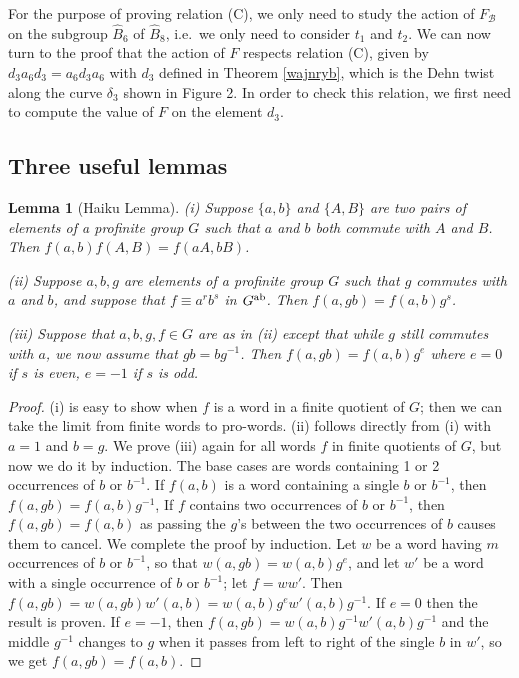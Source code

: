 \documentclass[a4paper,10pt,reqno]{amsart}
\newcommand\B{\widehat{B}}
\newtheorem{lem}[thm]{Lemma}
\begin{document}
For the purpose of proving relation (C), we only need to study the action of $F_{\mathcal{B}}$
on the subgroup $\B_6$ of $\B_8$, i.e.~we only need to consider $t_1$ and $t_2$.
We can now turn to the proof that the action of $F$ respects relation (C), given by
$d_3a_6d_3=a_6d_3a_6$ with $d_3$ defined in Theorem \ref{wajnryb},
which is the Dehn twist along the curve $\delta_3$ shown in Figure 2. In order
to check this relation, we first need to compute the value of $F$ on the element $d_3$. 

\subsection{Three useful lemmas}

\begin{lem}[Haiku Lemma] {\it (i) Suppose $\{a,b\}$ and $\{A,B\}$ are two pairs of elements of 
a profinite group $G$ such that $a$ and $b$ both commute with $A$ and $B$.  
Then $f(a,b)f(A,B)=f(aA,bB)$.

\vspace{.1cm}\noindent
(ii) Suppose $a,b,g$ are elements of a profinite group $G$
such that $g$ commutes with $a$ and $b$, and suppose that $f\equiv a^rb^s$ in $G^{\rm ab}$.
Then $f(a,gb)=f(a,b)g^s$.

\vspace{.1cm}
\noindent (iii) Suppose that $a,b,g,f\in G$ are as in (ii) except that while $g$ still commutes with
$a$, we now assume that $gb=bg^{-1}$. Then $f(a,gb)=f(a,b)g^e$ where $e=0$ if $s$ is even, 
$e=-1$ if $s$ is odd.}
\end{lem}

\begin{proof}

(i) is easy to show when $f$ is a word in a finite quotient of
$G$; then we can take the limit from finite words to pro-words. (ii) follows directly from (i)
with $a=1$ and $b=g$. We prove (iii) again for all words $f$ in finite quotients of $G$, but
now we do it by induction. The base cases are words containing 1 or 2 occurrences of $b$ or $b^{-1}$.
If $f(a,b)$ is a word containing a single $b$ or $b^{-1}$, then $f(a,gb)=f(a,b)g^{-1}$,
If $f$ contains two occurrences
of $b$ or $b^{-1}$, then $f(a,gb)=f(a,b)$ as passing the $g$'s between the two occurrences of $b$
causes them to cancel. We complete the proof by induction. Let $w$ be a word having $m$ occurrences
of $b$ or $b^{-1}$, so that $w(a,gb)=w(a,b)g^e$, and let $w'$ be a word with a single occurrence
of $b$ or $b^{-1}$; let $f=ww'$. Then $f(a,gb)=w(a,gb)w'(a,b)=w(a,b)g^ew'(a,b)g^{-1}$.
If $e=0$ then the result is proven. If $e=-1$, then $f(a,gb)=w(a,b)g^{-1}w'(a,b)g^{-1}$ and
the middle $g^{-1}$ changes to $g$ when it passes from left to right of the single $b$ in $w'$,
so we get $f(a,gb)=f(a,b)$. 
\end{proof}
\end{document}

